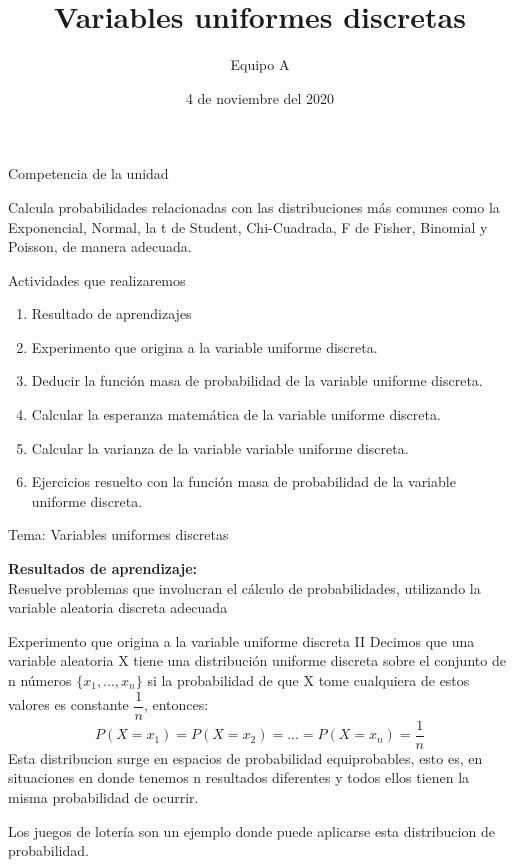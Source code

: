 \documentclass[11pt]{beamer}
\author{Equipo A}
\date{4 de noviembre del 2020}
\title{Variables uniformes discretas}
\institute{Universidad Autónoma de Yucatan}
\begin{document}
\begin{frame}
\titlepage
\end{frame}

\begin{frame}{Competencia de la unidad}
\begin{center}
Calcula probabilidades relacionadas con las distribuciones más comunes como la Exponencial, Normal, la t
de Student, Chi-Cuadrada, F de Fisher, Binomial y Poisson, de manera adecuada.
\end{center}
\end{frame}
\begin{frame}{Actividades que realizaremos}
\begin{enumerate}
\item Resultado de aprendizajes
\item Experimento que origina a la variable uniforme discreta.
\item Deducir la función masa de probabilidad de la variable uniforme discreta.
\item Calcular la esperanza matemática de la variable uniforme discreta.
\item Calcular la varianza de la variable variable uniforme discreta.
\item Ejercicios resuelto con la función masa de probabilidad de la variable uniforme discreta.
\end{enumerate}
\end{frame}

\begin{frame}{Tema: Variables uniformes discretas}
\begin{center}
\textbf{Resultados de aprendizaje:}\\
Resuelve problemas que involucran el cálculo de probabilidades, utilizando la variable aleatoria discreta adecuada
\end{center}
\end{frame}

\begin{frame}{Experimento que origina a la variable uniforme discreta II}
Decimos que una variable aleatoria X tiene una distribución uniforme discreta sobre el conjunto de n números $\lbrace x_{1},...,x_{n} \rbrace$ si la probabilidad de que X tome cualquiera de estos valores es constante $\dfrac{1}{n}$, entonces: 
$$
P(X=x_{1})=P(X=x_{2})=...=P(X=x_{n})={\dfrac{1}{n}}
$$
Esta distribucion surge en espacios de probabilidad equiprobables, esto es, en situaciones en donde tenemos n resultados diferentes y todos ellos tienen la misma probabilidad de ocurrir. 

Los juegos de lotería son un ejemplo donde puede aplicarse esta distribucion de probabilidad. 
\end{frame}
\end{document}
